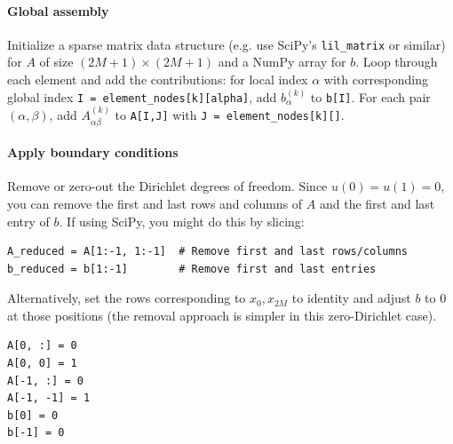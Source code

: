 \documentclass{article}
\begin{document}
\paragraph{Global assembly}
Initialize a sparse matrix data structure (e.g. use SciPy's \texttt{lil_matrix} or similar) for \(A\) of size \((2M+1)\times(2M+1)\) and a NumPy array for \(b\).
Loop through each element and add the contributions: for local index \(\alpha\) with corresponding global index \texttt{I = element_nodes[k][alpha]}, add \(b^{(k)}_\alpha\) to \texttt{b[I]}.
For each pair \((\alpha,\beta)\), add \(A^{(k)}_{\alpha\beta}\) to \texttt{A[I,J]} with \texttt{J = element_nodes[k][\beta]}.
% 	
% 	
% 		
% 	


\paragraph{Apply boundary conditions}
Remove or zero-out the Dirichlet degrees of freedom.
Since \(u(0)=u(1)=0\), you can remove the first and last rows and columns of \(A\) and the first and last entry of \(b\).
If using SciPy, you might do this by slicing:
\begin{verbatim}
A_reduced = A[1:-1, 1:-1]  # Remove first and last rows/columns
b_reduced = b[1:-1]        # Remove first and last entries
\end{verbatim}
Alternatively, set the rows corresponding to \(x_0,x_{2M}\) to identity and adjust \(b\) to 0 at those positions (the removal approach is simpler in this zero-Dirichlet case).
\begin{verbatim}
A[0, :] = 0
A[0, 0] = 1
A[-1, :] = 0
A[-1, -1] = 1
b[0] = 0
b[-1] = 0
\end{verbatim}
\end{document}
